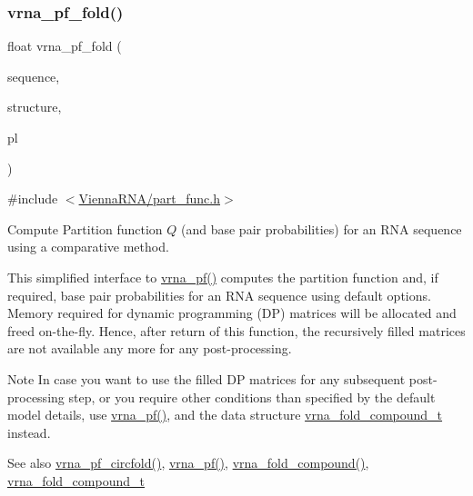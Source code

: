 \subsubsection{\texorpdfstring{vrna\+\_\+pf\+\_\+fold()}{vrna\_pf\_fold()}}
{\footnotesize\ttfamily float vrna\+\_\+pf\+\_\+fold (\begin{DoxyParamCaption}\item[{const char $\ast$}]{sequence,  }\item[{char $\ast$}]{structure,  }\item[{\mbox{\hyperlink{group__struct__utils_gab9ac98ab55ded9fb90043b024b915aca}{vrna\+\_\+ep\+\_\+t}} $\ast$$\ast$}]{pl }\end{DoxyParamCaption})}



{\ttfamily \#include $<$\mbox{\hyperlink{part__func_8h}{Vienna\+R\+N\+A/part\+\_\+func.\+h}}$>$}



Compute Partition function $Q$ (and base pair probabilities) for an R\+NA sequence using a comparative method. 

This simplified interface to \mbox{\hyperlink{group__pf__fold_ga29e256d688ad221b78d37f427e0e99bc}{vrna\+\_\+pf()}} computes the partition function and, if required, base pair probabilities for an R\+NA sequence using default options. Memory required for dynamic programming (DP) matrices will be allocated and free\textquotesingle{}d on-\/the-\/fly. Hence, after return of this function, the recursively filled matrices are not available any more for any post-\/processing.

\begin{DoxyNote}{Note}
In case you want to use the filled DP matrices for any subsequent post-\/processing step, or you require other conditions than specified by the default model details, use \mbox{\hyperlink{group__pf__fold_ga29e256d688ad221b78d37f427e0e99bc}{vrna\+\_\+pf()}}, and the data structure \mbox{\hyperlink{group__fold__compound_ga1b0cef17fd40466cef5968eaeeff6166}{vrna\+\_\+fold\+\_\+compound\+\_\+t}} instead.
\end{DoxyNote}
\begin{DoxySeeAlso}{See also}
\mbox{\hyperlink{group__pf__fold_ga87e5a77b6e50dd54e9d032a9b92973be}{vrna\+\_\+pf\+\_\+circfold()}}, \mbox{\hyperlink{group__pf__fold_ga29e256d688ad221b78d37f427e0e99bc}{vrna\+\_\+pf()}}, \mbox{\hyperlink{group__fold__compound_ga6601d994ba32b11511b36f68b08403be}{vrna\+\_\+fold\+\_\+compound()}}, \mbox{\hyperlink{group__fold__compound_ga1b0cef17fd40466cef5968eaeeff6166}{vrna\+\_\+fold\+\_\+compound\+\_\+t}}
\end{DoxySeeAlso}

